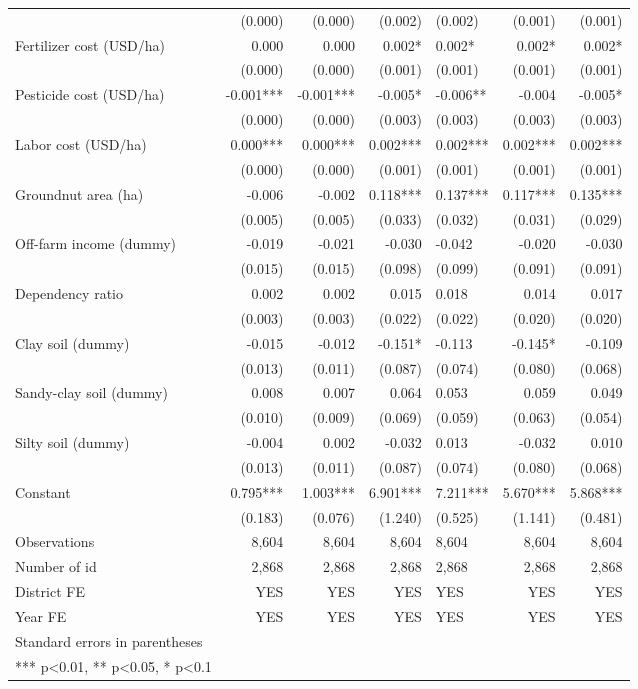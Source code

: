 \documentclass[
]{article}
\begin{document}
\begin{longtable}[t]{lrrrlrr}
 & (0.000) & (0.000) & (0.002) & (0.002) & (0.001) & (0.001)\\
Fertilizer cost (USD/ha) & 0.000 & 0.000 & 0.002* & 0.002* & 0.002* & 0.002*\\
 & (0.000) & (0.000) & (0.001) & (0.001) & (0.001) & (0.001)\\
\addlinespace
Pesticide cost (USD/ha) & -0.001*** & -0.001*** & -0.005* & -0.006** & -0.004 & -0.005*\\
 & (0.000) & (0.000) & (0.003) & (0.003) & (0.003) & (0.003)\\
Labor cost (USD/ha) & 0.000*** & 0.000*** & 0.002*** & 0.002*** & 0.002*** & 0.002***\\
 & (0.000) & (0.000) & (0.001) & (0.001) & (0.001) & (0.001)\\
Groundnut area (ha) & -0.006 & -0.002 & 0.118*** & 0.137*** & 0.117*** & 0.135***\\
\addlinespace
 & (0.005) & (0.005) & (0.033) & (0.032) & (0.031) & (0.029)\\
Off-farm income (dummy) & -0.019 & -0.021 & -0.030 & -0.042 & -0.020 & -0.030\\
 & (0.015) & (0.015) & (0.098) & (0.099) & (0.091) & (0.091)\\
Dependency ratio & 0.002 & 0.002 & 0.015 & 0.018 & 0.014 & 0.017\\
 & (0.003) & (0.003) & (0.022) & (0.022) & (0.020) & (0.020)\\
\addlinespace
Clay soil (dummy) & -0.015 & -0.012 & -0.151* & -0.113 & -0.145* & -0.109\\
 & (0.013) & (0.011) & (0.087) & (0.074) & (0.080) & (0.068)\\
Sandy-clay soil (dummy) & 0.008 & 0.007 & 0.064 & 0.053 & 0.059 & 0.049\\
 & (0.010) & (0.009) & (0.069) & (0.059) & (0.063) & (0.054)\\
Silty soil (dummy) & -0.004 & 0.002 & -0.032 & 0.013 & -0.032 & 0.010\\
\addlinespace
 & (0.013) & (0.011) & (0.087) & (0.074) & (0.080) & (0.068)\\
Constant & 0.795*** & 1.003*** & 6.901*** & 7.211*** & 5.670*** & 5.868***\\
 & (0.183) & (0.076) & (1.240) & (0.525) & (1.141) & (0.481)\\
Observations & 8,604 & 8,604 & 8,604 & 8,604 & 8,604 & 8,604\\
Number of id & 2,868 & 2,868 & 2,868 & 2,868 & 2,868 & 2,868\\
\addlinespace
District FE & YES & YES & YES & YES & YES & YES\\
Year FE & YES & YES & YES & YES & YES & YES\\
Standard errors in parentheses &  &  &  &  &  & \\
*** p<0.01, ** p<0.05, * p<0.1 &  &  &  &  &  & \\*
\end{longtable}
\endgroup{}
\end{document}
